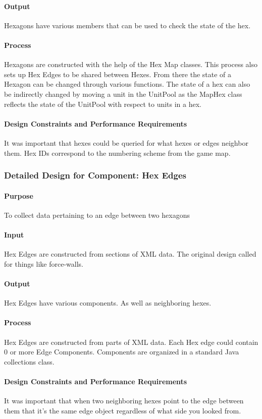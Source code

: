 \documentclass[12pt,a4paper,titlepage]{article}
\begin{document}
\paragraph{Output}
Hexagons have various members that can be used to check the state of the hex.
\paragraph{Process}
Hexagons are constructed with the help of the Hex Map classes.
This process also sets up Hex Edges to be shared between Hexes.
From there the state of a Hexagon can be changed through various functions.
The state of a hex can also be indirectly changed by moving a unit in the UnitPool
as the MapHex class reflects the state of the UnitPool with respect to units in a hex.
\paragraph{Design Constraints and Performance Requirements}
It was important that hexes could be queried for what hexes or edges neighbor them.
Hex IDs correspond to the numbering scheme from the game map.

\subsubsection{Detailed Design for Component: Hex Edges}
\paragraph{Purpose} To collect data pertaining to an edge between two hexagons
\paragraph{Input}
Hex Edges are constructed from sections of XML data.
The original design called for things like force-walls.
\paragraph{Output}
Hex Edges have various components. As well as neighboring hexes.
\paragraph{Process}
Hex Edges are constructed from parts of XML data.
Each Hex edge could contain 0 or more Edge Components.
Components are organized in a standard Java collections class.
\paragraph{Design Constraints and Performance Requirements}
It was important that when two neighboring hexes point to the edge between them
that it's the same edge object regardless of what side you looked from.
\end{document}
